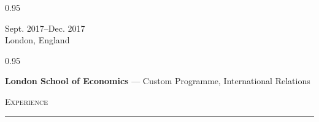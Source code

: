 \documentclass[a4paper,9pt]{article}
\newcommand{\mainMarginBottom}{\vspace*{2.5pt}}
\newcommand{\newLine}{\\}
\newcommand{\doubleColumnGap}{\hspace{4mm}}
\newcommand{\sectionMarginTopBottom}{\vspace*{9pt}}
\newcommand{\sectionMarginBetweenRemove}{\vspace{-5ex}}
\newcommand{\sectionMarginBetweenAdd}{\vspace{20pt}}
\newcommand{\withinSectionMarginBetween}{\vspace{-2.75ex}}
\newcommand{\mainLineSpacing}{0.95}
\def\hrulefill{\leavevmode\leaders\hrule height 1.75pt\hfill\kern0pt}
\begin{document}
\withinSectionMarginBetween{}

\begin{minipage}[t]{0.20\linewidth}
  \begin{small}
    \begin{spacing}\mainLineSpacing{}
      \begin{flushright}
        Sept. 2017--Dec. 2017
        \newLine{}
        \mainMarginBottom{}
        London, England
      \end{flushright}
    \end{spacing}
  \end{small}
\end{minipage}
\doubleColumnGap{}
\begin{minipage}[t]{0.75\linewidth}
  \begin{small}
    \begin{spacing}\mainLineSpacing{}
      \begin{flushleft}
        \textbf{London School of Economics} --- Custom Programme, International Relations
      \end{flushleft}
    \end{spacing}
  \end{small}
\end{minipage}

\sectionMarginBetweenRemove{}
\sectionMarginBetweenAdd{}

\hspace*{12pt}\textsc{\fontsize{20}{24}\selectfont Experience}\hspace*{14pt}\hrulefill
\sectionMarginTopBottom{}
\end{document}
